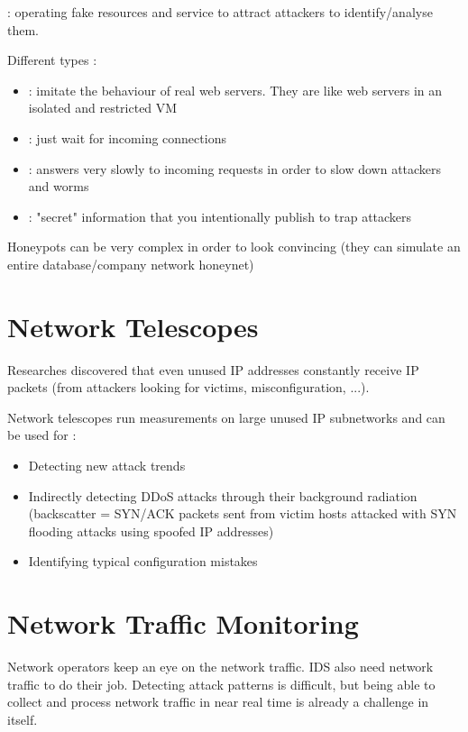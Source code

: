  : operating fake resources and service to attract attackers to identify/analyse them.

Different types :
\begin{itemize}
    \item {} : imitate the behaviour of real web servers. They are like web servers in an isolated and restricted VM
    \item {} : just wait for incoming connections
    \item {} : answers very slowly to incoming requests in order to slow down attackers and worms
    \item {} : "secret" information that you intentionally publish to trap attackers
\end{itemize}

Honeypots can be very complex in order to look convincing (they can simulate an entire database/company network honeynet)

\newpage
\section{Network Telescopes}

Researches discovered that even unused IP addresses constantly receive IP packets (from attackers looking for victims, misconfiguration, ...).

Network telescopes run measurements on large unused IP subnetworks and can be used for :
\begin{itemize}
    \item Detecting new attack trends
    \item Indirectly detecting DDoS attacks through their background radiation (backscatter = SYN/ACK packets sent from victim hosts attacked with SYN flooding attacks using spoofed IP addresses)
    \item Identifying typical configuration mistakes
\end{itemize}

\section{Network Traffic Monitoring}

Network operators keep an eye on the network traffic. IDS also need network traffic to do their job. Detecting attack patterns is difficult, but being able to collect and process network traffic in near real time is already a challenge in itself.

